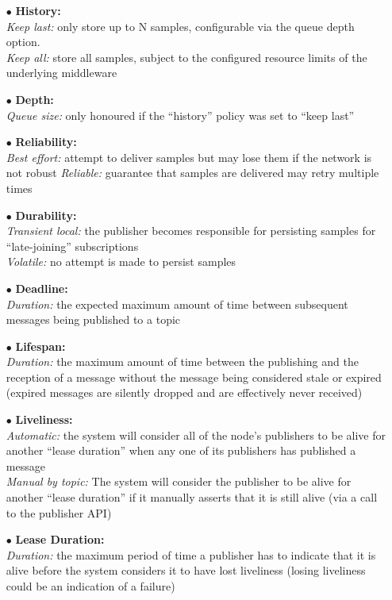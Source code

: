 \documentclass{article}
\begin{document}
\begin{enumerate}
    \item[$\bullet$] \textbf{History:}\\
    \textit{Keep last:} only store up to N samples, configurable via the queue depth option.\\
    \textit{Keep all:} store all samples, subject to the configured resource limits of the underlying middleware

    \item[$\bullet$] \textbf{Depth:} \\
    \textit{Queue size:} only honoured if the “history” policy was set to “keep last”

    \item[$\bullet$] \textbf{Reliability:}\\
    \textit{Best effort:} attempt to deliver samples but may lose them if the network is not robust
    \textit{Reliable:} guarantee that samples are delivered may retry multiple times

    \item[$\bullet$] \textbf{Durability:}\\
    \textit{Transient local:} the publisher becomes responsible for persisting samples for “late-joining” subscriptions\\
    \textit{Volatile:} no attempt is made to persist samples

    \item[$\bullet$] \textbf{Deadline:}\\
    \textit{Duration:} the expected maximum amount of time between subsequent messages being published to a topic

    \item[$\bullet$] \textbf{Lifespan:}\\
    \textit{Duration:} the maximum amount of time between the publishing and the reception of a message without the message being considered stale or expired (expired messages are silently dropped and are effectively never received)
    
    \item[$\bullet$] \textbf{Liveliness:}\\
    \textit{Automatic:} the system will consider all of the node’s publishers to be alive for another “lease duration” when any one of its publishers has published a message\\
    \textit{Manual by topic:} The system will consider the publisher to be alive for another “lease duration” if it manually asserts that it is still alive (via a call to the publisher API)
    
    \item[$\bullet$] \textbf{Lease Duration:}\\
    \textit{Duration:} the maximum period of time a publisher has to indicate that it is alive before the system considers it to have lost liveliness (losing liveliness could be an indication of a failure)
\end{enumerate}
\end{document}
